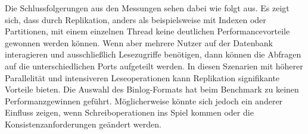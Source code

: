 Die Schlussfolgerungen aus den Messungen sehen dabei wie folgt aus.
Es zeigt sich, dass durch Replikation, anders als beispielsweise mit Indexen oder Partitionen, mit einem einzelnen Thread keine deutlichen Performancevorteile gewonnen werden können.
Wenn aber mehrere Nutzer auf der Datenbank interagieren und ausschließlich Lesezugriffe benötigen, dann können die Abfragen auf die unterschiedlichen Ports aufgeteilt werden.
In diesen Szenarien mit höherer Parallelität und intensiveren Leseoperationen kann Replikation signifikante Vorteile bieten.
Die Auswahl des Binlog-Formats hat beim Benchmark zu keinen Performanzgewinnen geführt.
Möglicherweise könnte sich jedoch ein anderer Einfluss zeigen, wenn Schreiboperationen ins Spiel kommen oder die Konsistenzanforderungen geändert werden.
